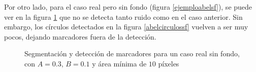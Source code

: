 Por otro lado, para el caso real pero sin fondo (figura \ref{ejemploabelsf}), se puede ver en la figura \ref{ejemploabel} que no se detecta tanto ruido como en el caso anterior. Sin embargo, los círculos detectados en la figura \ref{abelcirculossf} vuelven a ser muy pocos, dejando marcadores fuera de la detección.

\begin{figure}[ht!]
        \hspace{-1cm}
        \hspace{5 mm}
  \caption{Segmentación y detección de marcadores para un caso real sin fondo, con $A=0.3$, $B=0.1$ y área mínima de $10$ píxeles}
      \label{ejemploabel}
\end{figure}

